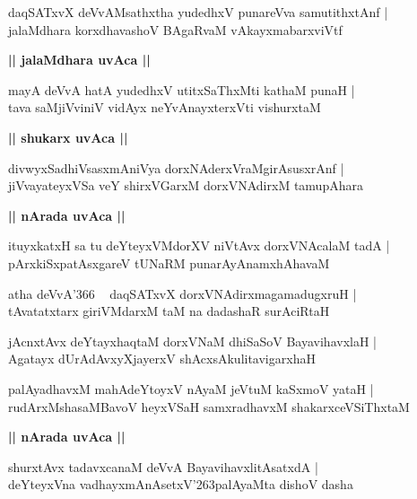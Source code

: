 \documentclass[twoside,12pt,openright]{book}
\def\S{\char'263}
\newcounter{shloka}[chapter]
\def\uvaca#1{\centerline{{\large\textbf{#1}}}}
\begin{document}
\begin{shloka}%
daqSATxvX deVvAMsathxtha yudedhxV punareVva samutithxtAnf |\\
jalaMdhara korxdhavashoV BAgaRvaM vAkayxmabarxviVtf 
\end{shloka}

\uvaca{|| jalaMdhara uvAca ||}

\begin{shloka}%
mayA deVvA hatA yudedhxV utitxSaThxMti kathaM punaH |\\
tava saMjiVviniV vidAyx neYvAnayxterxVti vishurxtaM 
\end{shloka}

\uvaca{|| shukarx uvAca ||}

\begin{shloka}%
divwyxSadhiVsasxmAniVya dorxNAderxVraMgirAsusxrAnf |\\
jiVvayateyxVSa veY shirxVGarxM dorxVNAdirxM tamupAhara
\end{shloka}

\uvaca{|| nArada uvAca ||}

\begin{shloka}%
ituyxkatxH sa tu deYteyxVMdorXV niVtAvx dorxVNAcalaM tadA |\\
pArxkiSxpatAsxgareV tUNaRM punarAyAnamxhAhavaM 
\end{shloka}

\begin{shloka}%
atha deVvA\char'366 ~ daqSATxvX dorxVNAdirxmagamadugxruH |\\
tAvatatxtarx giriVMdarxM taM na dadashaR surAciRtaH 
\end{shloka}

\begin{shloka}%
jAcnxtAvx deYtayxhaqtaM dorxVNaM dhiSaSoV BayavihavxlaH |\\
Agatayx dUrAdAvxyXjayerxV shAcxsAkulitavigarxhaH
\end{shloka}

\begin{shloka}%
palAyadhavxM mahAdeYtoyxV nAyaM jeVtuM kaSxmoV yataH |\\
rudArxMshasaMBavoV heyxVSaH samxradhavxM shakarxceVSiThxtaM 
\end{shloka}

\uvaca{|| nArada uvAca ||}

\begin{shloka}%
shurxtAvx tadavxcanaM deVvA BayavihavxlitAsatxdA |\\
deYteyxVna vadhayxmAnAsetxV\S palAyaMta dishoV dasha
\end{shloka}
\end{document}
